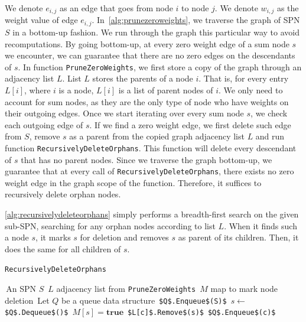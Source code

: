 \documentclass{amsart}
\theoremstyle{plain}
\numberwithin{equation}{section}
\newcommand{\code}[1]{\lstinline[mathescape=true]{#1}}
\newcommand{\mcode}[1]{\lstinline[mathescape]!#1!}
\begin{document}
We denote $e_{i,j}$ as an edge that goes from node $i$ to node $j$. We denote $w_{i,j}$ as the
weight value of edge $e_{i,j}$. In~\autoref{alg:prunezeroweights}, we traverse the graph of SPN $S$
in a bottom-up fashion. We run through the graph this particular way to avoid recomputations.  By
going bottom-up, at every zero weight edge of a sum node $s$ we encounter, we can guarantee that
there are no zero edges on the descendants of $s$. In function \code{PruneZeroWeights}, we first
store a copy of the graph through an adjacency list $L$. List $L$ stores the parents of a node $i$.
That is, for every entry $L[i]$, where $i$ is a node, $L[i]$ is a list of parent nodes of $i$. We
only need to account for sum nodes, as they are the only type of node who have weights on their
outgoing edges. Once we start iterating over every sum node $s$, we check each outgoing edge of
$s$. If we find a zero weight edge, we first delete such edge from $S$, remove $s$ as a parent from
the copied graph adjacency list $L$ and run function \code{RecursivelyDeleteOrphans}. This function
will delete every descendant of $s$ that has no parent nodes. Since we traverse the graph
bottom-up, we guarantee that at every call of \code{RecursivelyDeleteOrphans}, there exists no zero
weight edge in the graph scope of the function. Therefore, it suffices to recursively delete orphan
nodes.

\autoref{alg:recursivelydeleteorphans} simply performs a breadth-first search on the given sub-SPN,
searching for any orphan nodes according to list $L$. When it finds such a node $s$, it marks $s$
for deletion and removes $s$ as parent of its children. Then, it does the same for all children of
$s$.

\begin{algorithm}[h]
  \caption{\code{RecursivelyDeleteOrphans}}\label{alg:recursivelydeleteorphans}
  \begin{algorithmic}[1]
    \Require\,An SPN $S$
    \Require\,$L$ adjacency list from \code{PruneZeroWeights}
    \Require\,$M$ map to mark node deletion
    \State\,Let $Q$ be a queue data structure
    \State\,\mcode{$Q$.Enqueue$(S)$}
    \While{\textbf{not} \mcode{$Q$.Empty$()$}}
      \State\,$s\gets$ \mcode{$Q$.Dequeue$()$}
      \If{\mcode{$L[s]$.Empty$()$}}
        \State\,$M[s]=\textbf{true}$
          \State\,\mcode{$L[c]$.Remove$(s)$}
        \EndFor%
          \State\,\mcode{$Q$.Enqueue$(c)$}
        \EndFor%
      \EndIf%
    \EndWhile%
  \end{algorithmic}
\end{algorithm}
\end{document}
